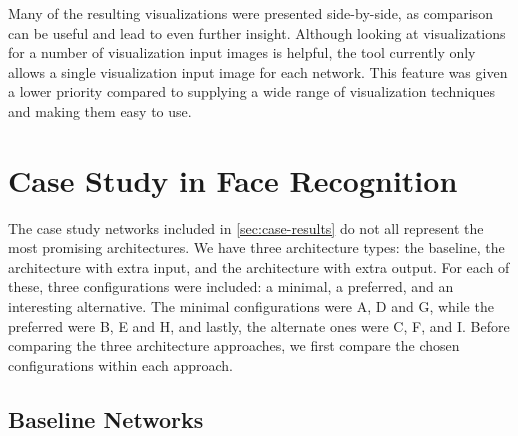 \begin{comment}
\noindent Note that both of our example \acrshortpl{ann} were networks already known to achieve good results. Thus our presented visualizations do not imply any obvious measures that could be taken in order to improve performance. However, as the visualizations still provided an extensive amount of information, it is likely that they could give good pointers on improvements for a lesser network. To be able to identify a network's shortcomings, it is essential to understand how the network behaves, and why it behaves that way. \\
\end{comment}

\noindent Many of the resulting visualizations were presented side-by-side, as comparison can be useful and lead to even further insight. Although looking at visualizations for a number of visualization input images is helpful, the tool currently only allows a single visualization input image for each network. This feature was given a lower priority compared to supplying a wide range of visualization techniques and making them easy to use.\\

\section{Case Study in Face Recognition}

The case study networks included in \autoref{sec:case-results} do not all represent the most promising architectures. We have three architecture types: the baseline, the architecture with extra input, and the architecture with extra output. For each of these, three configurations were included: a minimal, a preferred, and an interesting alternative. The minimal configurations were A, D and G, while the preferred were B, E and H, and lastly, the alternate ones were C, F, and I. Before comparing the three architecture approaches, we first compare the chosen configurations within each approach.

\subsection{Baseline Networks}

